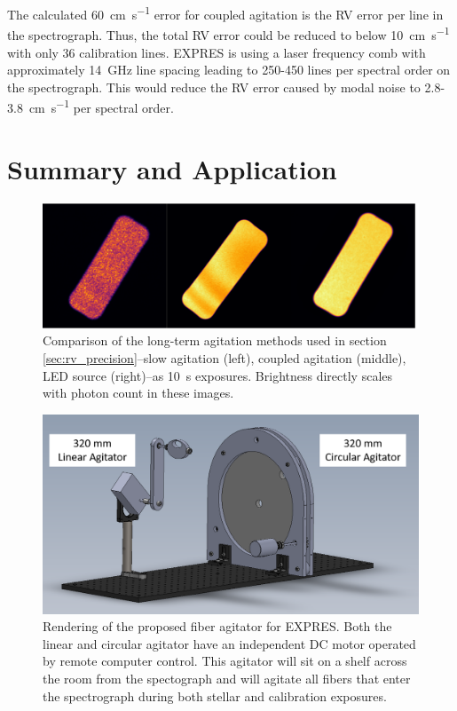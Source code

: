 \documentclass[twocolumn]{emulateapj}
\begin{document}
The calculated \SI{60}{\centi\meter\per\second} error for coupled agitation is the RV error per line in the spectrograph. Thus, the total RV error could be reduced to below \SI{10}{\centi\meter\per\second} with only 36 calibration lines. EXPRES is using a laser frequency comb with approximately \SI{14}{\giga\hertz} line spacing leading to 250-450 lines per spectral order on the spectrograph. This would reduce the RV error caused by modal noise to 2.8-\SI{3.8}{\centi\meter\per\second} per spectral order.

\section{Summary and Application}
\label{sec:conclusions}

\begin{figure}
\centering
	\includegraphics[width=\columnwidth]{images/fiber_rv_error.pdf}
	\caption{Comparison of the long-term agitation methods used in section \ref{sec:rv_precision}--slow agitation (left), coupled agitation (middle), LED source (right)--as \SI{10}{\second} exposures. Brightness directly scales with photon count in these images.}
\label{fig:fiber_rv_error}
\end{figure}

\begin{figure}
\centering
	\includegraphics[width=\columnwidth]{images/agitator_model.png}
	\caption{Rendering of the proposed fiber agitator for EXPRES. Both the linear and circular agitator have an independent DC motor operated by remote computer control. This agitator will sit on a shelf across the room from the spectograph and will agitate all fibers that enter the spectrograph during both stellar and calibration exposures.}
\label{fig:agitator_model}
\end{figure}
\end{document}
